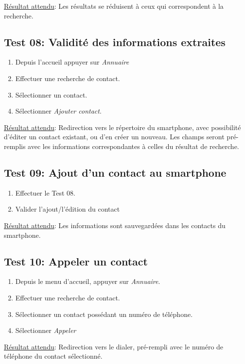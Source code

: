     \underline{Résultat attendu}: Les résultats se réduisent à ceux qui correspondent à la recherche.

  \subsection*{Test 08: Validité des informations extraites}
    \begin{enumerate}
    \item Depuis l'accueil appuyer sur \emph{Annuaire}
    \item Effectuer une recherche de contact.
    \item Sélectionner un contact.
    \item Sélectionner \emph{Ajouter contact}.
    \end{enumerate}

    \underline{Résultat attendu}: Redirection vers le répertoire du smartphone, avec possibilité d'éditer un contact existant, ou d'en créer un nouveau. 
    Les champs seront pré-remplis avec les informations correspondantes à celles du résultat de recherche.

  \subsection*{Test 09: Ajout d'un contact au smartphone}
    \begin{enumerate}
    \item Effectuer le Test 08.
    \item Valider l'ajout/l'édition du contact
    \end{enumerate}

    \underline{Résultat attendu}: Les informations sont sauvegardées dans les contacts du smartphone.

  \subsection*{Test 10: Appeler un contact}
    \begin{enumerate}
    \item Depuis le menu d'accueil, appuyer sur \emph{Annuaire}.
    \item Effectuer une recherche de contact.
    \item Sélectionner un contact possédant un numéro de téléphone.
    \item Sélectionner \emph{Appeler}
    \end{enumerate}

    \underline{Résultat attendu}: Redirection vers le dialer, pré-rempli avec le numéro de téléphone du contact sélectionné.

